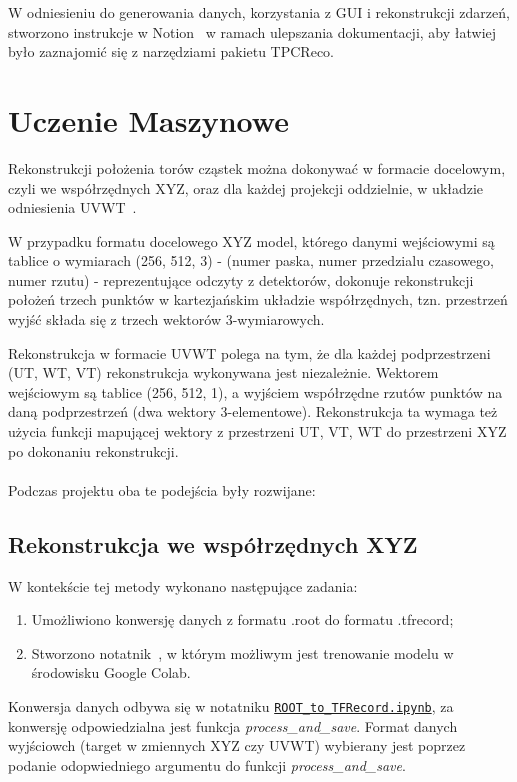 \documentclass{article}
\begin{document}
W odniesieniu do generowania danych, korzystania z GUI i rekonstrukcji zdarzeń, stworzono instrukcje w Notion~\cite{NotionDocs} w ramach ulepszania dokumentacji, aby łatwiej było zaznajomić się z narzędziami pakietu TPCReco.

\section{Uczenie Maszynowe}
Rekonstrukcji położenia torów cząstek można dokonywać w formacie docelowym, czyli we współrzędnych XYZ,
oraz dla każdej projekcji oddzielnie, w układzie odniesienia UVWT~\cite{UVWT}.

W przypadku formatu docelowego XYZ model, którego danymi wejściowymi są tablice o wymiarach (256, 512, 3) - (numer paska, numer przedzialu czasowego, numer rzutu) - reprezentujące odczyty z detektorów, dokonuje rekonstrukcji położeń trzech punktów w kartezjańskim układzie współrzędnych, tzn. przestrzeń wyjść składa się z trzech wektorów 3-wymiarowych.

Rekonstrukcja w formacie UVWT polega na tym, że dla każdej podprzestrzeni (UT, WT, VT) rekonstrukcja wykonywana jest niezależnie. Wektorem wejściowym są tablice (256, 512, 1), a wyjściem współrzędne rzutów punktów na daną podprzestrzeń (dwa wektory 3-elementowe). Rekonstrukcja ta wymaga też użycia funkcji mapującej wektory z przestrzeni UT, VT, WT do przestrzeni XYZ po dokonaniu rekonstrukcji.\\\\
Podczas projektu oba te podejścia były rozwijane:
\subsection{Rekonstrukcja we współrzędnych XYZ}
W kontekście tej metody wykonano następujące zadania:
\begin{enumerate}
    \item Umożliwiono konwersję danych z formatu .root do formatu .tfrecord;
    \item Stworzono notatnik~\cite{ColabML}, w którym możliwym jest trenowanie modelu w środowisku Google Colab.
\end{enumerate}
Konwersja danych odbywa się w notatniku \href{https://github.com/mwbaj/MachineLearning/blob/ZPS_2023_winter/WAWTPC/ROOT_to_TFRecord.ipynb}{\texttt{ROOT\_to\_TFRecord.ipynb}}, za konwersję odpowiedzialna jest funkcja \textit{process\_and\_save}.
Format danych wyjściowch (target w zmiennych XYZ czy UVWT) wybierany jest poprzez podanie odopwiedniego argumentu do funkcji \textit{process\_and\_save}.
\end{document}
